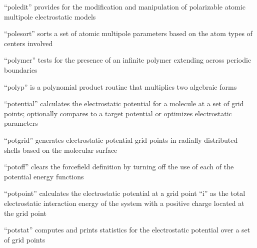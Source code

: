 \documentclass[letterpaper,11pt,english]{sphinxmanual}
\begin{document}
\sphinxAtStartPar
“poledit” provides for the modification and manipulation of polarizable atomic multipole electrostatic models

\sphinxAtStartPar
{}

\sphinxAtStartPar
“polesort” sorts a set of atomic multipole parameters based on the atom types of centers involved

\sphinxAtStartPar
{}

\sphinxAtStartPar
“polymer” tests for the presence of an infinite polymer extending across periodic boundaries

\sphinxAtStartPar
{}

\sphinxAtStartPar
“polyp” is a polynomial product routine that multiplies two algebraic forms

\sphinxAtStartPar
{}

\sphinxAtStartPar
“potential” calculates the electrostatic potential for a molecule at a set of grid points; optionally compares to a target potential or optimizes electrostatic parameters

\sphinxAtStartPar
{}

\sphinxAtStartPar
“potgrid” generates electrostatic potential grid points in radially distributed shells based on the molecular surface

\sphinxAtStartPar
{}

\sphinxAtStartPar
{}

\sphinxAtStartPar
“potoff” clears the forcefield definition by turning off the use of each of the potential energy functions

\sphinxAtStartPar
{}

\sphinxAtStartPar
“potpoint” calculates the electrostatic potential at a grid point “i” as the total electrostatic interaction energy of the system with a positive charge located at the grid point

\sphinxAtStartPar
{}

\sphinxAtStartPar
“potstat” computes and prints statistics for the electrostatic potential over a set of grid points

\sphinxAtStartPar
{}

\sphinxAtStartPar
{}
\end{document}
